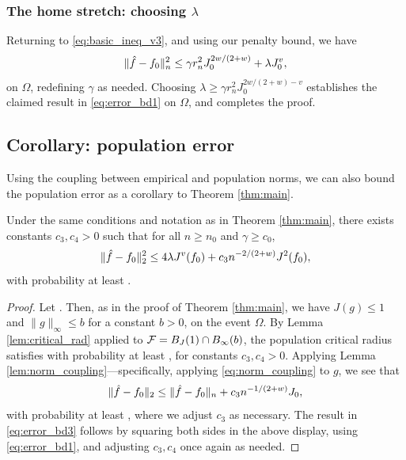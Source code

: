 \documentclass{article}
\begin{document}
\subsubsection{The home stretch: choosing $\lambda$}

Returning to \eqref{eq:basic_ineq_v3}, and using our penalty bound, we have 
\begin{equation}
\label{eq:basic_ineq_v3}
\|\hat{f} - f_0\|_n^2 \leq \gamma r_n^2 J_0^{2w/(2+w)} + \lambda J_0^v,
\end{equation}
on $\Omega$, redefining $\gamma$ as needed. Choosing $\lambda \geq \gamma r_n^2  
J_0^{2w/(2+w) - v}$ establishes the claimed result in \eqref{eq:error_bd1} on
$\Omega$, and completes the proof.    

\subsection{Corollary: population error}

Using the coupling between empirical and population norms, we can also bound the
population error as a corollary to Theorem \ref{thm:main}.

\begin{corollary}
\label{cor:main}
Under the same conditions and notation as in Theorem \ref{thm:main}, there
exists constants $c_3,c_4 > 0$ such that for all $n \geq n_0$ and $\gamma \geq
c_0$, 
\begin{equation}
\label{eq:error_bd3}
\|\hat{f} - f_0\|_2^2 \leq 4 \lambda J^v(f_0) + c_3 n^{-2/(2+w)} J^2(f_0),
\end{equation}
with probability at least .  

\end{corollary}

\begin{proof}
Let . Then, as in the proof of Theorem
\ref{thm:main}, we have $J(g) \leq 1$ and $\|g\|_\infty \leq b$ for a constant
$b>0$, on the event $\Omega$. By Lemma \ref{lem:critical_rad} applied to $\mathcal{F} = 
B_J(1) \cap B_\infty(b)$, the population critical radius satisfies
 with probability at least , for constants 
$c_3,c_4>0$. Applying Lemma \ref{lem:norm_coupling}---specifically, applying
\eqref{eq:norm_coupling} to $g$, we see that  
\[
\|\hat{f} - f_0\|_2 \leq \|\hat{f} - f_0\|_n + c_3 n^{-1/(2+w)} J_0,
\]
with probability at least , where we adjust $c_3$ as necessary. The result in
\eqref{eq:error_bd3} follows by squaring both sides in the above display, using
\eqref{eq:error_bd1}, and adjusting $c_3,c_4$ once again as needed.  
\end{proof}
\end{document}
